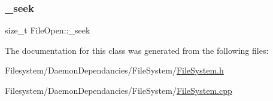 \subsubsection{\texorpdfstring{\+\_\+seek}{\_seek}}
{\footnotesize\ttfamily size\+\_\+t File\+Open\+::\+\_\+seek\hspace{0.3cm}{\ttfamily [private]}}



The documentation for this class was generated from the following files\+:\begin{DoxyCompactItemize}
\item 
Filesystem/\+Daemon\+Dependancies/\+File\+System/\mbox{\hyperlink{_file_system_8h}{File\+System.\+h}}\item 
Filesystem/\+Daemon\+Dependancies/\+File\+System/\mbox{\hyperlink{_file_system_8cpp}{File\+System.\+cpp}}\end{DoxyCompactItemize}
